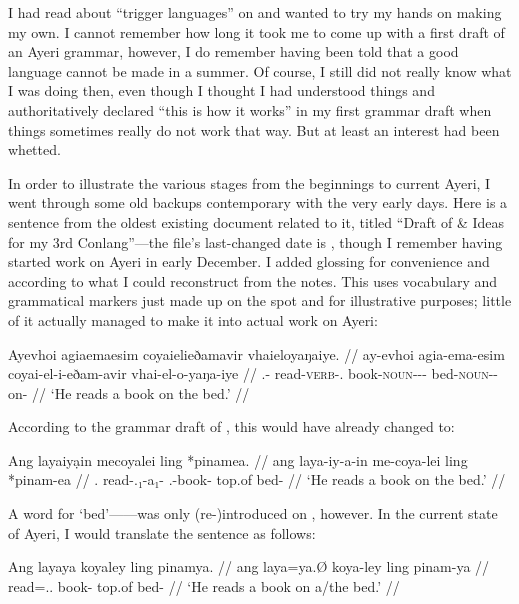I had read about ``trigger languages'' on  and wanted to
try my hands on making my own. I cannot remember how long it took me to come up
with a first draft of an Ayeri grammar, however, I do remember having been told
that a good language cannot be made in a summer. Of course, I still did not
really know what I was doing then, even though I thought I had understood
things and authoritatively declared ``this is how it works'' in my first
grammar draft when things sometimes really do not work that way. But at least
an interest had been whetted.

In order to illustrate the various stages from the beginnings to current Ayeri,
I went through some old backups contemporary with the very early days. 
Here is a sentence from the oldest existing document related to it, titled 
``Draft of \& Ideas for my 3rd Conlang''---the file's last-changed date is 
, though I remember having started work on Ayeri in early 
December. I added glossing for convenience and according to what I could 
reconstruct from the notes. This uses vocabulary and grammatical markers just 
made up on the spot and for illustrative purposes; little of it actually 
managed to make it into actual work on Ayeri:

\ex\begingl
	\gla Ayevhoi agiaemaesim coyaielieðamavir vhaieloyaŋaiye. //
	\glb ay-evhoi agia-ema-esim coyai-el-i-eðam-avir vhai-el-o-yaŋa-iye //
	\glc \Tsg{}.\An{}-\Subj{} read-\textsc{verb}-\Subj{}.\An{} 
		book-\textsc{noun}-\An{}-\Indf{}-\Parg{} 
		bed-\textsc{noun}-\Inan{}-on-\Loc{} //
	\glft `He reads a book on the bed.' //
\endgl\xe

According to the grammar draft of , this would have already
changed to:

\ex\begingl
	\gla Ang layaiyạin mecoyalei ling *pinamea. //
	\glb ang laya-iy-a-in me-coya-lei ling *pinam-ea //
	\glc \Aarg{}.\Subj{} read-\Tsg{}.\An{}₁-a₁-\Subj{} 
		\Indf{}.\Inan{}-book-\PargI{} top.of bed-\Loc{} //
	\glft `He reads a book on the bed.' //
\endgl\xe

A word for `bed'------was only (re-)introduced on
, however. In the current state of Ayeri, I would 
translate the sentence as follows:

\ex\begingl
	\gla Ang layaya koyaley ling pinamya. //
	\glb ang laya=ya.Ø koya-ley ling pinam-ya //
	\glc \AgtT{} read=\Tsg{}.\M{}.\Top{} book-\PargI{} top.of bed-\Loc{} //
	\glft `He reads a book on a/the bed.' //
\endgl\xe

